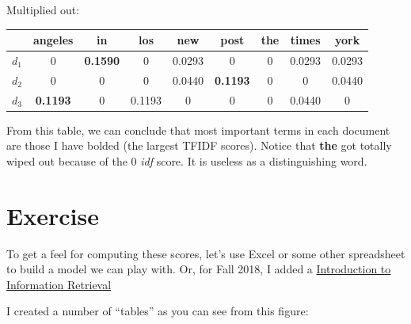 \documentclass[10pt]{article}
\begin{document}
\noindent Multiplied out:
 
 \begin{table}[H]
\begin{center}
\begin{tabular}{c|c|c|c|c|c|c|c|c}
 & angeles & in & los & new & post & the & times & york\\
\hline
$d_1$ & 0 & {\bf 0.1590} & 0 & 0.0293 & 0 & 0 & 0.0293 & 0.0293 \\
$d_2$ & 0 & 0 & 0 & 0.0440 & {\bf 0.1193} & 0 & 0 & 0.0440\\
$d_3$ & {\bf 0.1193} & 0 & 0.1193 & 0 & 0 & 0 & 0.0440 & 0\\
\end{tabular}
\end{center}
\label{default}
\end{table}%

From this table, we can conclude that most important terms in each document are those I have bolded (the largest TFIDF scores). Notice that {\bf the} got totally wiped out because of the 0 {\em idf} score. It is useless as a distinguishing word.

\section{Exercise}

To get a feel for computing these scores, let's use Excel or some other spreadsheet to build a model we can play with. Or, for Fall 2018, I added a \href{http://nlp.stanford.edu/IR-book/html/htmledition/term-frequency-and-weighting-1.html}{Introduction to Information Retrieval}

 I created a number of ``tables'' as you can see from this figure:

\begin{figure}[H]
\begin{center}
\label{default}
\end{center}
\end{figure}
\end{document}
